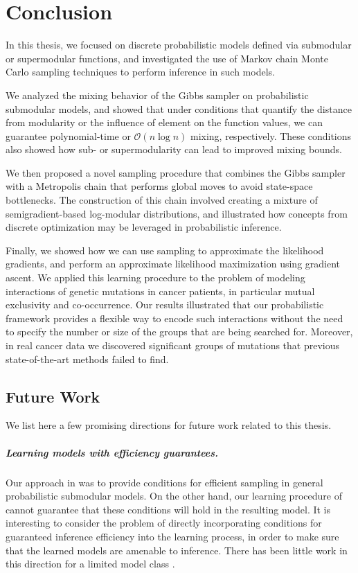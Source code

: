 \chapter{Conclusion} \label{ch:conclusion}

In this thesis, we focused on discrete probabilistic models defined via submodular or supermodular functions, and investigated the use of Markov chain Monte Carlo sampling techniques to perform inference in such models.

We analyzed the mixing behavior of the Gibbs sampler on probabilistic submodular models, and showed that under conditions that quantify the distance from modularity or the influence of element on the function values, we can guarantee polynomial-time or $\mathcal{O}(n\log n)$ mixing, respectively.
These conditions also showed how sub- or supermodularity can lead to improved mixing bounds.

We then proposed a novel sampling procedure that combines the Gibbs sampler with a Metropolis chain that performs global moves to avoid state-space bottlenecks.
The construction of this chain involved creating a mixture of semigradient-based log-modular distributions, and illustrated how concepts from discrete optimization may be leveraged in probabilistic inference.

Finally, we showed how we can use sampling to approximate the likelihood gradients, and perform an approximate likelihood maximization using gradient ascent.
We applied this learning procedure to the problem of modeling interactions of genetic mutations in cancer patients, in particular mutual exclusivity and co-occurrence.
Our results illustrated that our probabilistic framework provides a flexible way to encode such interactions without the need to specify the number or size of the groups that are being searched for.
Moreover, in real cancer data we discovered significant groups of mutations that previous state-of-the-art methods failed to find.

\section{Future Work}
We list here a few promising directions for future work related to this thesis.

\paragraph{Learning models with efficiency guarantees.}
Our approach in  was to provide conditions for efficient sampling in general probabilistic submodular models.
On the other hand, our learning procedure of  cannot guarantee that these conditions will hold in the resulting model.
It is interesting to consider the problem of directly incorporating conditions for guaranteed inference efficiency into the learning process, in order to make sure that the learned models are amenable to inference.
There has been little work in this direction for a limited model class \citep{domke15}.

